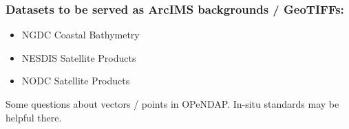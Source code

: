 \subsubsection{Datasets to be served as ArcIMS backgrounds / GeoTIFFs:}

\begin{itemize}
\item NGDC Coastal Bathymetry
\item NESDIS Satellite Products
\item NODC Satellite Products
\end{itemize}

Some questions about vectors / points in OPeNDAP. In-situ standards may
be helpful there.
 
 
%
%
%
%

